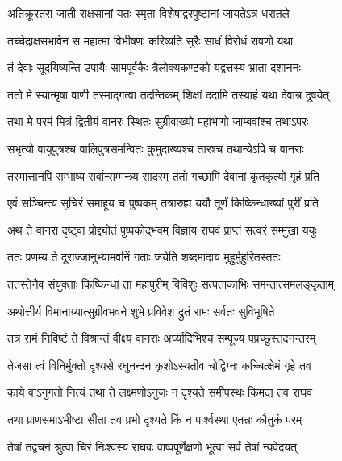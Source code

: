 \twolineshloka
{अतिक्रूरतरा जाती राक्षसानां यतः स्मृता}
{विशेषाद्वरपुष्टानां जायतेऽत्र धरातले}%

\twolineshloka
{तच्चेद्राक्षसभावेन स महात्मा विभीषणः}
{करिष्यति सुरैः सार्धं विरोधं रावणो यथा}%

\twolineshloka
{तं देवाः सूदयिष्यन्ति उपायैः सामपूर्वकैः}
{त्रैलोक्यकण्टको यद्वत्तस्य भ्राता दशाननः}%

\twolineshloka
{ततो मे स्यान्मृषा वाणी तस्माद्गत्वा तदन्तिकम्}
{शिक्षां ददामि तस्याहं यथा देवान्न दूषयेत्}%

\twolineshloka
{तथा मे परमं मित्रं द्वितीयं वानरः स्थितः}
{सुग्रीवाख्यो महाभागो जाम्बवांश्च तथाऽपरः}%

\twolineshloka
{सभृत्यो वायुपुत्रश्च वालिपुत्रसमन्वितः}
{कुमुदाख्यश्च तारश्च तथान्येऽपि च वानराः}%

\twolineshloka
{तस्मात्तानपि सम्भाष्य सर्वान्सम्मन्त्र्य सादरम्}
{ततो गच्छामि देवानां कृतकृत्यो गृहं प्रति}%

\twolineshloka
{एवं सञ्चिन्त्य सुचिरं समाहूय च पुष्पकम्}
{तत्रारुह्य ययौ तूर्णं किष्किन्धाख्यां पुरीं प्रति}%

\twolineshloka
{अथ ते वानरा दृष्ट्वा प्रोद्द्योतं पुष्पकोद्भवम्}
{विज्ञाय राघवं प्राप्तं सत्वरं सम्मुखा ययुः}%

\twolineshloka
{ततः प्रणम्य ते दूराज्जानुभ्यामवनिं गताः}
{जयेति शब्दमादाय मुहुर्मुहुरितस्ततः}%

\twolineshloka
{ततस्तेनैव संयुक्ताः किष्किन्धां तां महापुरीम्}
{विविशुः सत्पताकाभिः समन्तात्समलङ्कृताम्}%

\twolineshloka
{अथोत्तीर्य विमानाग्र्यात्सुग्रीवभवने शुभे}
{प्रविवेश द्रुतं रामः सर्वतः सुविभूषिते}%

\twolineshloka
{तत्र रामं निविष्टं ते विश्रान्तं वीक्ष्य वानराः}
{अर्घ्यादिभिश्च सम्पूज्य पप्रच्छुस्तदनन्तरम्}%


\twolineshloka
{तेजसा त्वं विनिर्मुक्तो दृश्यसे रघुनन्दन}
{कृशोऽस्यतीव चोद्विग्नः कच्चित्क्षेमं गृहे तव}%

\twolineshloka
{काये वाऽनुगतो नित्यं तथा ते लक्ष्मणोऽनुजः}
{न दृश्यते समीपस्थः किमद्य तव राघव}%

\twolineshloka
{तथा प्राणसमाऽभीष्टा सीता तव प्रभो}
{दृश्यते किं न पार्श्वस्था एतन्नः कौतुकं परम्}%


\twolineshloka
{तेषां तद्वचनं श्रुत्वा चिरं निःश्वस्य राघवः}
{वाष्पपूर्णेक्षणो भूत्वा सर्वं तेषां न्यवेदयत्}%

